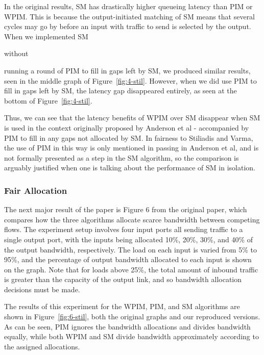 In the original results, SM has drastically higher queueing latency than PIM or WPIM. This is because the output-initiated matching of SM means that several cycles may go by before an input with traffic to send is selected by the output. When we implemented SM \begin{em}without\end{em} running a round of PIM to fill in gaps left by SM, we produced similar results, seen in the middle graph of Figure~\ref{fig:4-stil}. However, when we did use PIM to fill in gaps left by SM, the latency gap disappeared entirely, as seen at the bottom of Figure~\ref{fig:4-stil}.

Thus, we can see that the latency benefits of WPIM over SM disappear when SM is used in the context originally proposed by Anderson et al - accompanied by PIM to fill in any gaps not allocated by SM. In fairness to Stiliadis and Varma, the use of PIM in this way is only mentioned in passing in Anderson et al, and is not formally presented as a step in the SM algorithm, so the comparison is arguably justified when one is talking about the performance of SM in isolation.
\subsubsection{Fair Allocation}
The next major result of the paper is Figure 6 from the original paper, which compares how the three algorithms allocate scarce bandwidth between competing flows. The experiment setup involves four input ports all sending traffic to a single output port, with the inputs being allocated 10\%, 20\%, 30\%, and 40\% of the output bandwidth, respectively. The load on each input is varied from 5\% to 95\%, and the percentage of output bandwidth allocated to each input is shown on the graph. Note that for loads above 25\%, the total amount of inbound traffic is greater than the capacity of the output link, and so bandwidth allocation decisions must be made.

The results of this experiment for the WPIM, PIM, and SM algorithms are shown in Figure~\ref{fig:6-stil}, both the original graphs and our reproduced versions. As can be seen, PIM ignores the bandwidth allocations and divides bandwidth equally, while both WPIM and SM divide bandwidth approximately according to the assigned allocations. 

